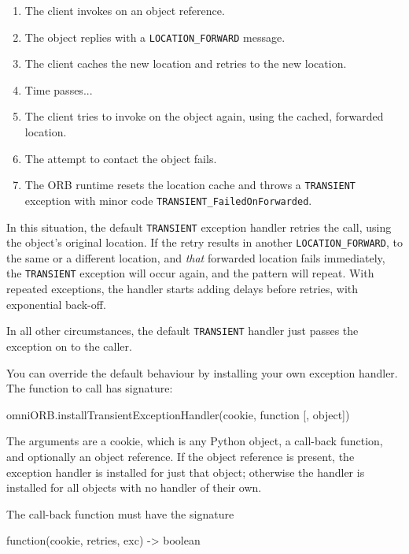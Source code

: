 \documentclass[11pt,oneside,a4paper]{book}
\newcommand{\code}[1]{\texttt{#1}}
\newcommand{\dsc}{\discretionary{}{}{}}
\begin{document}
\begin{enumerate}

\item The client invokes on an object reference.
\item The object replies with a \code{LOCATION\_FORWARD} message.
\item The client caches the new location and retries to the new location.
\item Time passes...
\item The client tries to invoke on the object again, using the
      cached, forwarded location. 
\item The attempt to contact the object fails.
\item The ORB runtime resets the location cache and throws a
      \code{TRANSIENT} exception with minor code
      \code{TRANSIENT\_FailedOnForwarded}.

\end{enumerate}

In this situation, the default \code{TRANSIENT} exception handler
retries the call, using the object's original location. If the retry
results in another \code{LOCATION\_\dsc{}FORWARD}, to the same or a
different location, and \emph{that} forwarded location fails
immediately, the \code{TRANSIENT} exception will occur again, and the
pattern will repeat. With repeated exceptions, the handler starts
adding delays before retries, with exponential back-off.

In all other circumstances, the default \code{TRANSIENT} handler just
passes the exception on to the caller.

You can override the default behaviour by installing your own
exception handler. The function to call has signature:

\begin{pylisting}
omniORB.installTransientExceptionHandler(cookie, function [, object])
\end{pylisting}

The arguments are a cookie, which is any Python object, a call-back
function, and optionally an object reference. If the object reference
is present, the exception handler is installed for just that object;
otherwise the handler is installed for all objects with no handler of
their own.

The call-back function must have the signature

\begin{pylisting}
function(cookie, retries, exc) -> boolean
\end{pylisting}
\end{document}
